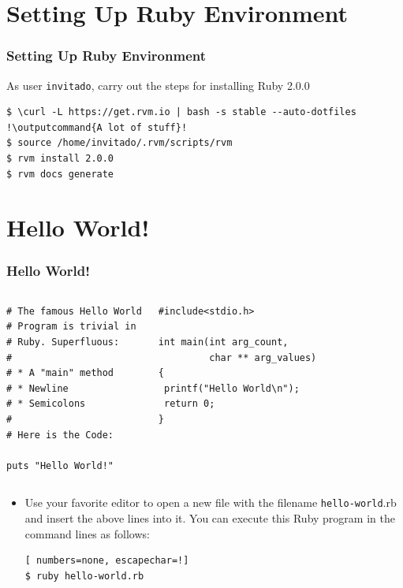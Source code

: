 \documentclass{beamer}
\newcommand{\outputcommand}[1]{\color{darkgreen}{#1}}
\begin{document}
\section{Setting Up Ruby Environment}
\begin{frame}[fragile]
\frametitle{Setting Up Ruby Environment}
As user \texttt{invitado}, carry out the steps for installing Ruby 2.0.0

\lstset{language=shell}
\begin{lstlisting}[numbers=none, escapechar=!]
$ \curl -L https://get.rvm.io | bash -s stable --auto-dotfiles
!\outputcommand{A lot of stuff}!
$ source /home/invitado/.rvm/scripts/rvm
$ rvm install 2.0.0
$ rvm docs generate
\end{lstlisting}

\end{frame}
\section{Hello World!}
\begin{frame}[fragile]
\frametitle{Hello World!}
\begin{columns}
\lstset{language=Ruby, style=eclipse}
\begin{lstlisting}[escapechar=!]
# The famous Hello World
# Program is trivial in
# Ruby. Superfluous:
#
# * A "main" method
# * Newline
# * Semicolons
#
# Here is the Code:

puts "Hello World!"
\end{lstlisting}
\lstset{language=C, style=eclipse}
\begin{lstlisting}[escapechar=!]
#include<stdio.h>

int main(int arg_count,
         char ** arg_values)
{
 printf("Hello World\n");
 return 0;
}
\end{lstlisting}
\end{columns}
\begin{itemize}
 \item Use your favorite editor to open a new file with the filename \texttt{hello-world}.rb and insert the above lines into it. You can execute this Ruby program in the command lines as follows:

\lstset{language=shell}
\begin{lstlisting}[ numbers=none, escapechar=!]
$ ruby hello-world.rb
\end{lstlisting}
\end{itemize}



\end{frame}
\end{document}
